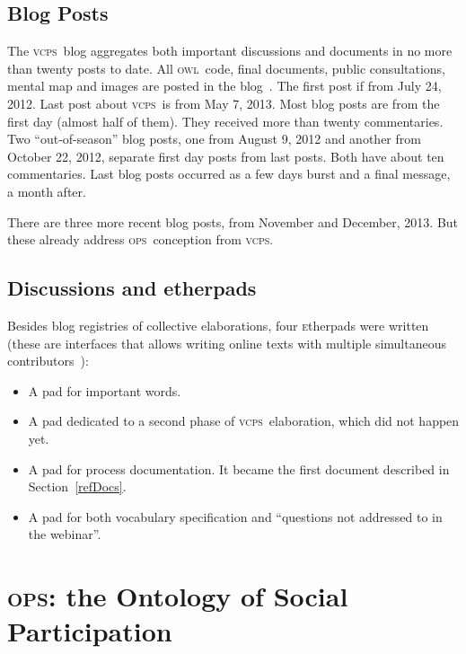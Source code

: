 \documentclass[10pt,letterpaper]{article}
\newcommand{\ops}{\textsc{ops}}
\newcommand{\vcps}{\textsc{vcps}}
\newcommand{\owl}{\textsc{owl}}
\newcommand{\etherpad}{\textsc{e}therpad}
\begin{document}
\subsection{Blog Posts}
The \vcps\ blog
aggregates both important discussions and documents in no more than twenty posts to date.
All \owl\ code, final documents, public consultations, mental map and images are posted in the blog~\cite{coraisBlog}. 
The first post if from July 24, 2012. Last post about \vcps\ is from May 7, 2013. Most blog posts are from the first day (almost half of them). They received more than
twenty commentaries. Two ``out-of-season'' blog posts, one from August 9, 2012 and another from October  22, 2012, separate first day posts from last posts. Both have about ten commentaries.
Last blog posts occurred as a few days burst and a final message, a month after.

There are three more recent blog posts, from November and December, 2013. But these already address \ops\ conception from \vcps.

\subsection{Discussions and etherpads}
Besides blog registries of collective elaborations, four \etherpad s
were written~\cite{etherpads} (these are interfaces that allows writing online texts with multiple simultaneous contributors~\cite{etherpads2}):
\begin{itemize}
    \item A pad for important words.
    \item A pad dedicated to a second phase of \vcps\ elaboration, which did not happen yet.
    \item A pad for process documentation. It became the first document described in Section~\ref{refDocs}. 
    \item A pad for both vocabulary specification and ``questions not addressed to in the webinar''.
\end{itemize}



\section{\ops: the Ontology of Social Participation}\label{exp}
\end{document}
